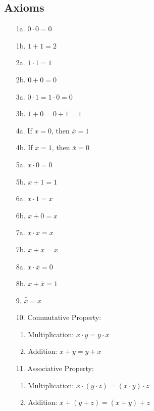 \documentclass[12pt,openany, tikz,border=10pt]{book}
\begin{document}
        \subsection{Axioms}
        \begin{multicols}{2} %
            \begin{enumerate}
                \item[1a.] $0 \cdot 0 = 0$
                \item[1b.] $1 + 1 = 2$
                \item[2a.] $1 \cdot 1 = 1$
                \item[2b.] $0 + 0 = 0$
                \item[3a.] $0 \cdot 1 = 1 \cdot 0 = 0$
                \item[3b.] $1 + 0 = 0 + 1 = 1$
                \item[4a.] If $x = 0$, then $\bar{x} = 1$
                \item[4b.] If $x = 1$, then $\bar{x} = 0$
                \item[5a.] $x \cdot 0 = 0$
                \item[5b.] $x + 1 = 1$
                \item[6a.] $x \cdot 1 = x$
                \item[6b.] $x + 0 = x$
                \item[7a.] $x \cdot x = x$
                \item[7b.] $x + x = x$
                \item[8a.] $x \cdot \bar{x} = 0$
                \item[8b.] $x + \bar{x} = 1$
                \item[9.] $\bar{\bar{x}} = x$
                \item[10.] Commutative Property:
                \begin{enumerate}
                  \item Multiplication: \( x \cdot y = y \cdot x \)
                  \item Addition: \( x + y = y + x \)
                \end{enumerate}
                \item[11.] Associative Property:
                \begin{enumerate}
                  \item Multiplication: \( x \cdot (y \cdot z) = (x \cdot y) \cdot z \)
                  \item Addition: \( x + (y + z) = (x + y) + z \)

\end{enumerate}
\end{enumerate}
\end{multicols}
\end{document}
